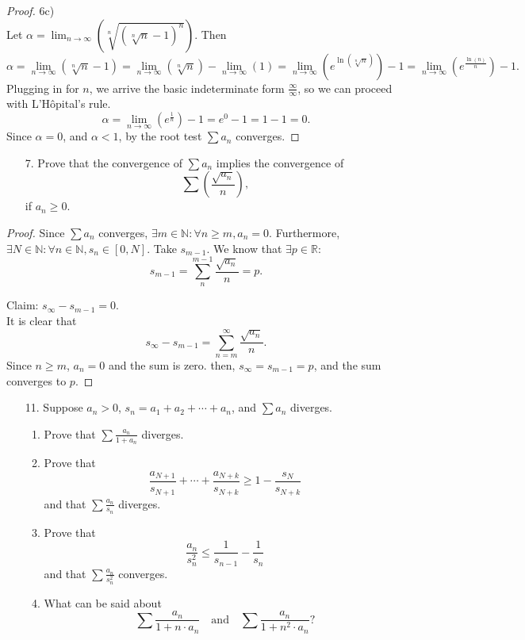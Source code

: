 \documentclass[10pt]{article}
\theoremstyle{definition}
\theoremstyle{plain}
\newcommand{\N}{\mathbb{N}}
\newcommand{\R}{\mathbb{R}}
\begin{document}
\begin{proof}
6c) \\

Let $\alpha = \lim_{n\rightarrow\infty} (\sqrt[n]{(\sqrt[n]{n} - 1)^n}).$ Then
$$\alpha = \lim_{n\rightarrow\infty} (\sqrt[n]{n} - 1) = \lim_{n\rightarrow\infty} (\sqrt[n]{n}) - \lim_{n\rightarrow\infty} (1) = \lim_{n\rightarrow\infty} (e^{\ln(\sqrt[n]{n})}) - 1 = \lim_{n\rightarrow\infty} (e^{\frac{\ln(n)}{n}}) - 1.$$
Plugging in for $n$, we arrive the basic indeterminate form $\frac{\infty}{\infty}$, so we can proceed with L'Hôpital's rule.
$$\alpha = \lim_{n\rightarrow\infty} (e^{\frac{1}{n}}) - 1 = e^0 - 1 = 1 - 1 = 0.$$
Since $\alpha = 0$, and $\alpha < 1$, by the root test $\sum a_n$ converges.
\end{proof}




\pagebreak



\begin{enumerate}
\item[7.] Prove that the convergence of $\sum a_n$ implies the convergence of
$$\sum \left(\frac{\sqrt{a_n}}{n}\right),$$
if $a_n \geq 0$.
\end{enumerate}

\begin{proof}
Since $\sum a_n$ converges, $\exists m\in \N: \forall n\geq m, a_n = 0.$ Furthermore, $\exists N\in \N: \forall n\in\N, s_n \in [0,N]$.
Take $s_{m-1}$. We know that $\exists p\in \R:$
$$s_{m-1} = \sum_n^{m-1} \frac{\sqrt{a_n}}{n} = p.$$

Claim: $s_\infty - s_{m-1} = 0$. \\
It is clear that
$$s_\infty - s_{m-1} = \sum_{n=m}^{\infty} \frac{\sqrt{a_n}}{n}.$$
Since $n\geq m$, $a_n = 0$ and the sum is zero. then, $s_\infty = s_{m-1} = p$, and the sum converges to $p$.
\end{proof}



\pagebreak



\begin{enumerate}
\item[11.] Suppose $a_n > 0$, $s_n = a_1+a_2+\cdots+a_n$, and $\sum a_n$ diverges.
\begin{enumerate}
\item Prove that $\sum\frac{a_n}{1+ a_n}$ diverges.
\item Prove that
$$\frac{a_{N+1}}{s_{N+1}} + \cdots + \frac{a_{N+k}}{s_{N+k}} \geq 1- \frac{s_{N}}{s_{N+k}}$$
and that $\sum\frac{a_n}{s_n}$ diverges.
\item Prove that
$$\frac{a_n}{s^2_n}\leq \frac{1}{s_{n-1}} - \frac{1}{s_n}$$
and that $\sum\frac{a_n}{s^2_n}$ converges.
\item What can be said about
$$\sum\frac{a_n}{1+n\cdot a_n} \quad\text{and} \quad \sum\frac{a_n}{1+n^2 \cdot a_n}?$$
\end{enumerate}
\end{enumerate}
\end{document}
